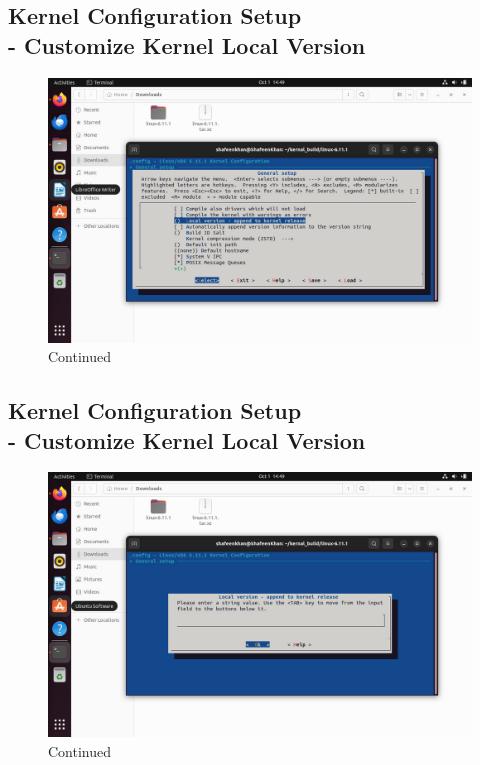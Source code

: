 \documentclass{article}
\begin{document}
\subsection{Kernel Configuration Setup\\ - Customize Kernel Local Version}
\begin{figure}[H]
    \centering
    \includegraphics[width=0.8\linewidth]{55.jpg}
    \caption{Continued}
\end{figure}


\subsection{Kernel Configuration Setup\\ - Customize Kernel Local Version}
\begin{figure}[H]
    \centering
    \includegraphics[width=0.8\linewidth]{54.jpg}
    \caption{Continued}
\end{figure}
\end{document}
